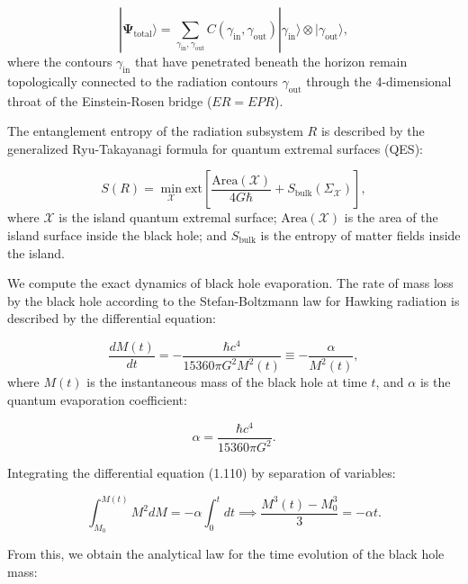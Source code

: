 \begin{equation}\label{eq:1.108}\tag{1.108}
|\mathbf{\Psi}_{\text{total}}\rangle = \sum_{\gamma_{\text{in}}, \gamma_{\text{out}}} C(\gamma_{\text{in}}, \gamma_{\text{out}}) |\gamma_{\text{in}}\rangle \otimes |\gamma_{\text{out}}\rangle,
\end{equation}
where the contours $\gamma_{\text{in}}$ that have penetrated beneath the horizon remain topologically connected to the radiation contours $\gamma_{\text{out}}$ through the 4-dimensional throat of the Einstein-Rosen bridge ($ER = EPR$).

The entanglement entropy of the radiation subsystem $R$ is described by the generalized Ryu-Takayanagi formula for quantum extremal surfaces (QES):

\begin{equation}\label{eq:1.109}\tag{1.109}
S(R) = \min_{\mathcal{X}} \text{ext} \left[ \frac{\text{Area}(\mathcal{X})}{4 G \hbar} + S_{\text{bulk}}(\Sigma_{\mathcal{X}}) \right],
\end{equation}
where $\mathcal{X}$ is the island quantum extremal surface; $\text{Area}(\mathcal{X})$ is the area of the island surface inside the black hole; and $S_{\text{bulk}}$ is the entropy of matter fields inside the island.

We compute the exact dynamics of black hole evaporation. The rate of mass loss by the black hole according to the Stefan-Boltzmann law for Hawking radiation is described by the differential equation:

\begin{equation}\label{eq:1.110}\tag{1.110}
\frac{dM(t)}{dt} = -\frac{\hbar c^4}{15360 \pi G^2 M^2(t)} \equiv -\frac{\alpha}{M^2(t)},
\end{equation}
where $M(t)$ is the instantaneous mass of the black hole at time $t$, and $\alpha$ is the quantum evaporation coefficient:

\begin{equation}\label{eq:1.111}\tag{1.111}
\alpha = \frac{\hbar c^4}{15360 \pi G^2}.
\end{equation}

Integrating the differential equation (1.110) by separation of variables:

\begin{equation}\label{eq:1.113}\tag{1.113}
\int_{M_0}^{M(t)} M^2 dM = -\alpha \int_0^t dt \implies \frac{M^3(t) - M_0^3}{3} = -\alpha t.
\end{equation}

From this, we obtain the analytical law for the time evolution of the black hole mass:


